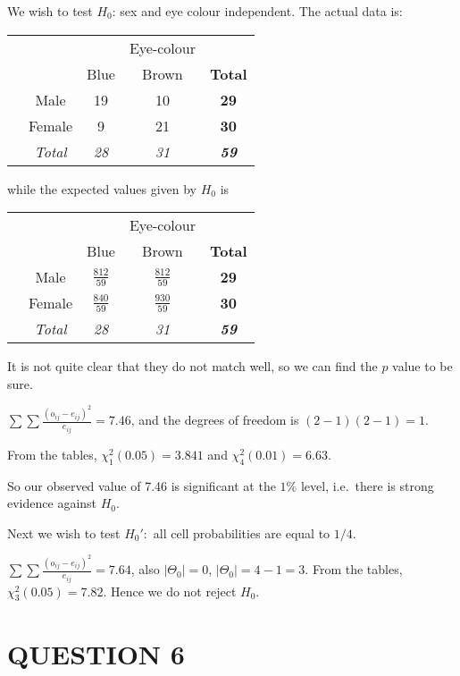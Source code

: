 \documentclass[a4paper]{article}
\begin{document}
We wish to test $H_0$: sex and eye colour independent. The actual data is:
\begin{center}
	\begin{tabular}{ccccc}
		\toprule
		& & & Eye-colour\\
		& & Blue & Brown & \textbf{Total}\\\midrule
		\multirow{3}{*}{\rotatebox[origin=c]{90}{Sex}}& Male & 19 & 10 & \textbf{29}\\
		& Female & 9 & 21 & \textbf{30}\\\cmidrule{2-5} 
		& \textit{Total} & \textit{28} & \textit{31} & \textit{\textbf{59}}\\\bottomrule
	\end{tabular}
\end{center}
while the expected values given by $H_0$ is
\begin{center}
	\begin{tabular}{ccccc}
		\toprule
		& & & Eye-colour\\
		& & Blue & Brown & \textbf{Total}\\\midrule
		\multirow{3}{*}{\rotatebox[origin=c]{90}{Sex}}& Male & $ \frac{812}{59} $ & $ \frac{812}{59} $ & \textbf{29}\\
		& Female & $ \frac{840}{59} $ & $ \frac{930}{59} $ & \textbf{30}\\\cmidrule{2-5} 
		& \textit{Total} & \textit{28} & \textit{31} & \textit{\textbf{59}}\\\bottomrule
	\end{tabular}
\end{center}
It is not quite clear that they do not match well, so we can find the $p$ value to be sure.

$\displaystyle\sum\sum \frac{(o_{ij} - e_{ij})^2}{e_{ij}} = 7.46$, and the degrees of freedom is $(2 - 1)(2 - 1) = 1$.

From the tables, $\chi_1^2(0.05) = 3.841$ and $\chi_4^2(0.01) = 6.63$.

So our observed value of 7.46 is significant at the $1\%$ level, i.e.\ there is strong evidence against $H_0$. 

Next we wish to test $ H_0':$ all cell probabilities are equal to $ 1/4 $.

  $\displaystyle\sum\sum \frac{(o_{ij} - e_{ij})^2}{e_{ij}} = 7.64$, also $ \left| \Theta_{0} \right| = 0 $, $ \left| \Theta_{0} \right| = 4 -1 = 3  $. 
From the tables, $\chi_3^2(0.05) = 7.82$. Hence we do not reject $ H_{0} $. 


\section{QUESTION 6}
\end{document}
